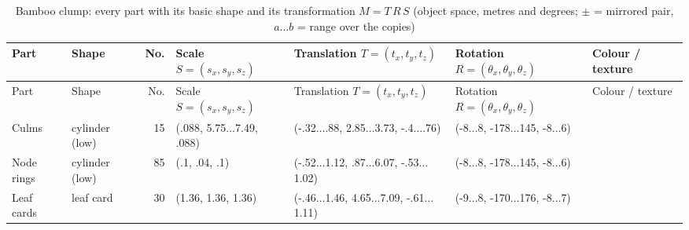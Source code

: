 {\scriptsize\setlength{\tabcolsep}{3pt}
\begin{longtable}{@{}P{2.6cm} P{1.65cm} r P{2.85cm} P{3.3cm} P{2.05cm} P{1.75cm}@{}}
\caption{Bamboo clump: every part with its basic shape and its transformation $M = T\,R\,S$ (object space, metres and degrees; $\pm$ = mirrored pair, $a\ldots b$ = range over the copies)}\\
\toprule
Part & Shape & No. & Scale $S=(s_x,s_y,s_z)$ & Translation $T=(t_x,t_y,t_z)$ & Rotation $R=(\theta_x,\theta_y,\theta_z)$ & Colour / texture \\
\midrule
\endfirsthead
\toprule
Part & Shape & No. & Scale $S=(s_x,s_y,s_z)$ & Translation $T=(t_x,t_y,t_z)$ & Rotation $R=(\theta_x,\theta_y,\theta_z)$ & Colour / texture \\
\midrule
\endhead
\bottomrule
\endfoot
Culms & cylinder (low) & 15 & (.088, 5.75$\ldots$7.49, .088) & (-.32$\ldots$.88, 2.85$\ldots$3.73, -.4$\ldots$.76) & (-8$\ldots$8, -178$\ldots$145, -8$\ldots$6) &  \\
Node rings & cylinder (low) & 85 & (.1, .04, .1) & (-.52$\ldots$1.12, .87$\ldots$6.07, -.53$\ldots$1.02) & (-8$\ldots$8, -178$\ldots$145, -8$\ldots$6) &  \\
Leaf cards & leaf card & 30 & (1.36, 1.36, 1.36) & (-.46$\ldots$1.46, 4.65$\ldots$7.09, -.61$\ldots$1.11) & (-9$\ldots$8, -170$\ldots$176, -8$\ldots$7) &   \\
\end{longtable}}
